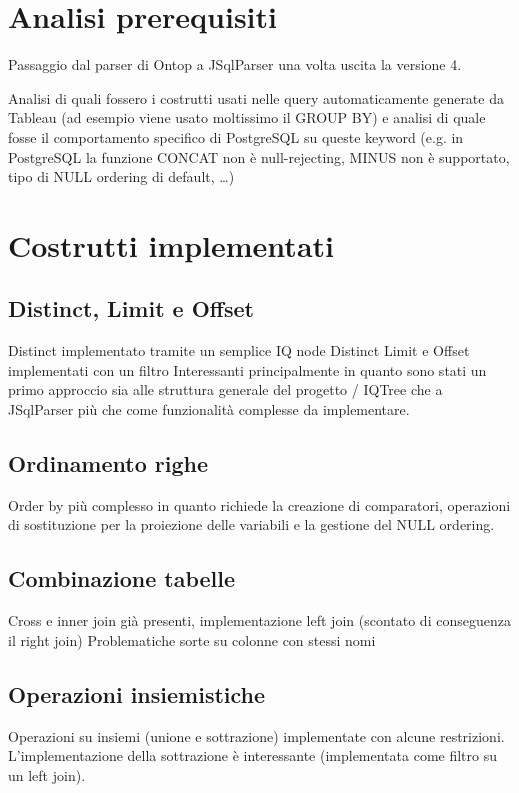 \section{Analisi prerequisiti}
\label{sec:prerequisits}
Passaggio dal parser di Ontop a JSqlParser una volta uscita la versione 4.

Analisi di quali fossero i costrutti usati nelle query automaticamente generate da Tableau (ad esempio viene usato moltissimo il GROUP BY) e analisi di quale fosse il comportamento specifico di PostgreSQL su queste keyword
(e.g. in PostgreSQL la funzione CONCAT non è null-rejecting, MINUS non è supportato, tipo di NULL ordering di default, \dots)

\section{Costrutti implementati}
\label{sec:implementation}

\subsection{Distinct, Limit e Offset}
Distinct implementato tramite un semplice IQ node Distinct
Limit e Offset implementati con un filtro
Interessanti principalmente in quanto sono stati un primo approccio sia alle struttura generale del progetto / IQTree che a JSqlParser più che come funzionalità complesse da implementare.

\subsection{Ordinamento righe}
Order by più complesso in quanto richiede la creazione di comparatori, operazioni di sostituzione per la proiezione delle variabili 
e la gestione del NULL ordering.

\subsection{Combinazione tabelle}
Cross e inner join già presenti, implementazione left join (scontato di conseguenza il right join) 
Problematiche sorte su colonne con stessi nomi

\subsection{Operazioni insiemistiche}
Operazioni su insiemi (unione e sottrazione) implementate con alcune restrizioni.
L'implementazione della sottrazione è interessante (implementata come filtro su un left join).

